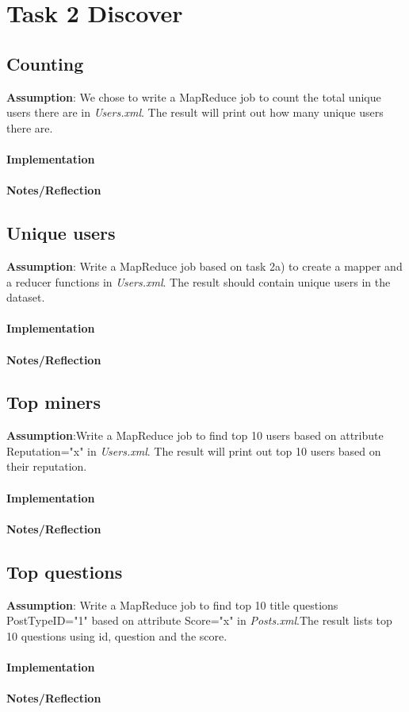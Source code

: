 \documentclass[fleqn,10pt]{wlscirep}
\begin{document}
\section{Task 2 Discover}

\subsection{Counting }
\textbf{Assumption}: We chose to write a MapReduce job to count the total unique users there are in \textit{Users.xml}. The result will print out how many unique users there are.\\ \\
\textbf{Implementation}  \\ \\
\textbf{Notes/Reflection}


\subsection{Unique users }
\textbf{Assumption}: Write a MapReduce job based on task 2a) to create a mapper  and a reducer functions in \textit{Users.xml}. The result should contain unique users in the dataset.  \\ \\
\textbf{Implementation}  \\ \\
\textbf{Notes/Reflection}
 

\subsection{Top miners }
\textbf{Assumption}:Write a MapReduce job to find top 10 users based on attribute Reputation="x" in \textit{Users.xml}. The result will print out top 10 users based on their reputation. \\ \\
\textbf{Implementation}  \\ \\
\textbf{Notes/Reflection}


\subsection{Top questions }
\textbf{Assumption}: Write a MapReduce job to find top 10 title questions PostTypeID="1"  based on attribute Score="x" in \textit{Posts.xml}.The result lists top 10 questions using id, question and the score.\\ \\
\textbf{Implementation}  \\ \\
\textbf{Notes/Reflection}

\end{document}

